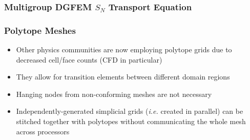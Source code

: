 \documentclass[compress,10pt]{beamer}
\begin{document}
\begin{frame}[t]\frametitle{Multigroup DGFEM $S_N$ Transport Equation}

\end{frame}
\begin{frame}[t]\frametitle{Polytope Meshes}
         \begin{block}{}{\footnotesize
			\begin{itemize}
				\item <1-> Other physics communities are now employing polytope grids due to decreased cell/face counts (CFD in particular)
				\item <2-> They allow for transition elements between different domain regions
				\item <3-> Hanging nodes from non-conforming meshes are not necessary
				\item <4-> Independently-generated simplicial grids ({\em i.e.} created in parallel) can be stitched together with polytopes without communicating the whole mesh across processors
			\end{itemize}}
         \end{block}
\centering
{}
\end{frame}
\end{document}
